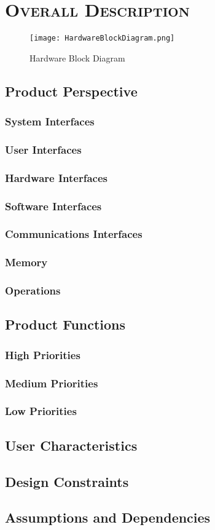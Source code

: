 \documentclass[ProjectRequirements.tex]{subfiles}
\begin{document}
\bigskip

\section{\textsc{\Large Overall Description}}
	\begin{figure}[H]
		\centering
		\texttt{[image: HardwareBlockDiagram.png]}
		\caption{Hardware Block Diagram \label{fig:HardwareBlockDiagram}}
	\end{figure}
	\subsection{Product Perspective}
		\subsubsection{System Interfaces}
		\subsubsection{User Interfaces}
		\subsubsection{Hardware Interfaces}
		\subsubsection{Software Interfaces}
		\subsubsection{Communications Interfaces}
		\subsubsection{Memory}
		\subsubsection{Operations}
	\subsection{Product Functions}
		\subsubsection{High Priorities}
		\subsubsection{Medium Priorities}
		\subsubsection{Low Priorities}
	\subsection{User Characteristics}
	\subsection{Design Constraints}
	\subsection{Assumptions and Dependencies}
\end{document}
